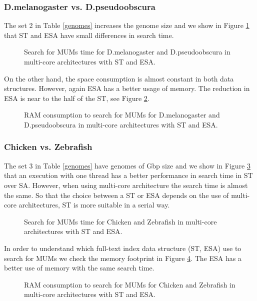 \documentclass{acm_proc_article-sp}
\begin{document}
\subsubsection{D.melanogaster vs. D.pseudoobscura}
The set 2 in Table \ref{genomes} increases the genome size and we show in Figure \ref{fig:fly-mum} that ST and ESA have small differences in search time.
\begin{figure}[h]
  \centering
  \caption{Search for MUMs time for D.melanogaster and D.pseudoobscura in multi-core architectures with ST and ESA.}
  \label{fig:fly-mum}
\end{figure}  
On the other hand, the space consumption is almost constant in both data structures. However, again ESA has a better usage of memory. The reduction in ESA is near to the half of the ST, see Figure \ref{fig:fly-ram}.
\begin{figure}[h]
  \centering
  \caption{RAM consumption to search for MUMs for D.melanogaster and D.pseudoobscura in multi-core architectures with ST and ESA.}
  \label{fig:fly-ram}
\end{figure}  
\subsubsection{Chicken vs. Zebrafish}
The set 3 in Table \ref{genomes} have genomes of Gbp size and we show in Figure \ref{fig:chicken-mum} that an execution with one thread has a better performance in search time in ST over SA. However, when using multi-core architecture the search time is almost the same. So that the choice between a ST or ESA depends on the use of multi-core architectures, ST is more suitable in a serial way.
\begin{figure}[h]
  \centering
  \caption{Search for MUMs time for Chicken and Zebrafish in multi-core architectures with ST and ESA.}
  \label{fig:chicken-mum}
\end{figure}  
In order to understand which full-text index data structure (ST, ESA) use to search for MUMs we check the memory footprint in Figure \ref{fig:chicken-ram}. The ESA has a better use of memory with the same search time.
\begin{figure}[h]
  \centering
  \caption{RAM consumption to search for MUMs for Chicken and Zebrafish in multi-core architectures with ST and ESA.}
  \label{fig:chicken-ram}
\end{figure}  
\end{document}
